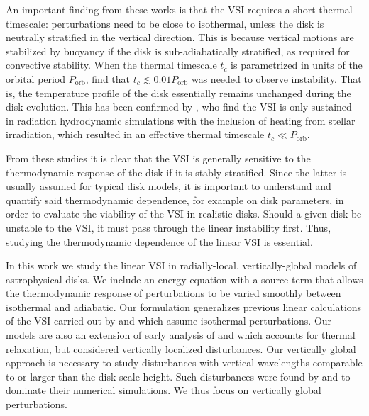 \documentclass[iop]{emulateapj}
\begin{document}
An important finding from these works is that the VSI requires a short
thermal timescale: perturbations need to be close to
isothermal, unless the disk is neutrally stratified in the vertical
direction. This is because vertical motions are stabilized by
buoyancy if the disk is sub-adiabatically stratified, as required for
convective stability. When the thermal timescale $t_c$ is parametrized
in units of the orbital period $P_\mathrm{orb}$, \cite{nelson13} find that
$t_c\lesssim 0.01P_\mathrm{orb}$ was needed to observe instability. That is, the
temperature profile of the disk essentially remains unchanged during
the disk evolution. This has been confirmed by 
\cite{stoll14}, who find the VSI is only sustained in radiation
hydrodynamic simulations with the inclusion of heating from stellar
irradiation, which resulted in an effective thermal timescale $t_c\ll
P_\mathrm{orb}$. 


From these studies it is clear that the VSI is generally sensitive to
the thermodynamic response of the disk if it is stably
stratified. Since the latter is usually assumed for typical disk
models,  
it is 
important to understand and quantify said thermodynamic dependence,
for example on disk parameters, in order to evaluate the viability of
the VSI in realistic disks. %
Should a given disk be unstable to the VSI, it must pass through the
linear instability first. Thus, studying the thermodynamic dependence
of the linear VSI is essential. %

In this work we study the linear VSI in radially-local,
vertically-global models of astrophysical disks. We include an energy
equation with a source term that allows the thermodynamic response of
perturbations to be varied smoothly between isothermal and adiabatic. Our
formulation generalizes previous linear calculations of the 
VSI carried out by \cite{nelson13} and \cite{mcnally14} which assume
isothermal perturbations. Our models are also an extension of early
analysis of \cite{urpin98} and \cite{urpin03} which accounts for thermal
relaxation, but considered vertically localized disturbances. Our
vertically global approach is necessary to study disturbances with
vertical wavelengths comparable to or larger than the disk scale
height. Such disturbances were  found by \cite{nelson13} and
\cite{stoll14} to dominate their numerical simulations.  We thus focus
on vertically global perturbations.  
\end{document}
